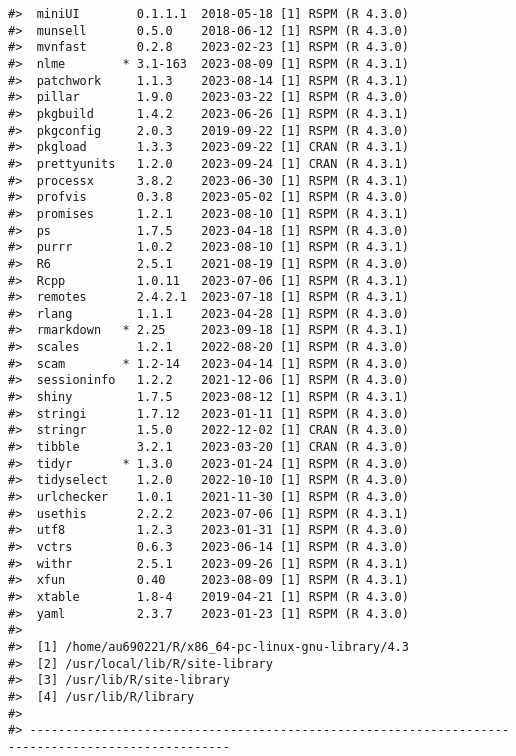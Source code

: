 \documentclass[12pt,]{article}
\begin{document}
\begin{verbatim}
#>  miniUI        0.1.1.1  2018-05-18 [1] RSPM (R 4.3.0)
#>  munsell       0.5.0    2018-06-12 [1] RSPM (R 4.3.0)
#>  mvnfast       0.2.8    2023-02-23 [1] RSPM (R 4.3.0)
#>  nlme        * 3.1-163  2023-08-09 [1] RSPM (R 4.3.1)
#>  patchwork     1.1.3    2023-08-14 [1] RSPM (R 4.3.1)
#>  pillar        1.9.0    2023-03-22 [1] RSPM (R 4.3.0)
#>  pkgbuild      1.4.2    2023-06-26 [1] RSPM (R 4.3.1)
#>  pkgconfig     2.0.3    2019-09-22 [1] RSPM (R 4.3.0)
#>  pkgload       1.3.3    2023-09-22 [1] CRAN (R 4.3.1)
#>  prettyunits   1.2.0    2023-09-24 [1] CRAN (R 4.3.1)
#>  processx      3.8.2    2023-06-30 [1] RSPM (R 4.3.1)
#>  profvis       0.3.8    2023-05-02 [1] RSPM (R 4.3.0)
#>  promises      1.2.1    2023-08-10 [1] RSPM (R 4.3.1)
#>  ps            1.7.5    2023-04-18 [1] RSPM (R 4.3.0)
#>  purrr         1.0.2    2023-08-10 [1] RSPM (R 4.3.1)
#>  R6            2.5.1    2021-08-19 [1] RSPM (R 4.3.0)
#>  Rcpp          1.0.11   2023-07-06 [1] RSPM (R 4.3.1)
#>  remotes       2.4.2.1  2023-07-18 [1] RSPM (R 4.3.1)
#>  rlang         1.1.1    2023-04-28 [1] RSPM (R 4.3.0)
#>  rmarkdown   * 2.25     2023-09-18 [1] RSPM (R 4.3.1)
#>  scales        1.2.1    2022-08-20 [1] RSPM (R 4.3.0)
#>  scam        * 1.2-14   2023-04-14 [1] RSPM (R 4.3.0)
#>  sessioninfo   1.2.2    2021-12-06 [1] RSPM (R 4.3.0)
#>  shiny         1.7.5    2023-08-12 [1] RSPM (R 4.3.1)
#>  stringi       1.7.12   2023-01-11 [1] RSPM (R 4.3.0)
#>  stringr       1.5.0    2022-12-02 [1] CRAN (R 4.3.0)
#>  tibble        3.2.1    2023-03-20 [1] CRAN (R 4.3.0)
#>  tidyr       * 1.3.0    2023-01-24 [1] RSPM (R 4.3.0)
#>  tidyselect    1.2.0    2022-10-10 [1] RSPM (R 4.3.0)
#>  urlchecker    1.0.1    2021-11-30 [1] RSPM (R 4.3.0)
#>  usethis       2.2.2    2023-07-06 [1] RSPM (R 4.3.1)
#>  utf8          1.2.3    2023-01-31 [1] RSPM (R 4.3.0)
#>  vctrs         0.6.3    2023-06-14 [1] RSPM (R 4.3.0)
#>  withr         2.5.1    2023-09-26 [1] RSPM (R 4.3.1)
#>  xfun          0.40     2023-08-09 [1] RSPM (R 4.3.1)
#>  xtable        1.8-4    2019-04-21 [1] RSPM (R 4.3.0)
#>  yaml          2.3.7    2023-01-23 [1] RSPM (R 4.3.0)
#> 
#>  [1] /home/au690221/R/x86_64-pc-linux-gnu-library/4.3
#>  [2] /usr/local/lib/R/site-library
#>  [3] /usr/lib/R/site-library
#>  [4] /usr/lib/R/library
#> 
#> --------------------------------------------------------------------------------------------------
\end{verbatim}
\end{document}
